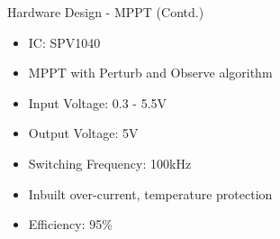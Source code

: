 \documentclass[aspectratio=169]{beamer}
\begin{document}
		\begin{frame}{Hardware Design - MPPT (Contd.)}
			\begin{itemize}
				\item IC: SPV1040
				\item MPPT with Perturb and Observe algorithm	
				\item Input Voltage: 0.3 - 5.5V
				\item Output Voltage: 5V
				\item Switching Frequency: 100kHz
				\item Inbuilt over-current, temperature protection
				\item Efficiency: 95\%
			\end{itemize}
		\end{frame}
		
		
		
\end{document}
